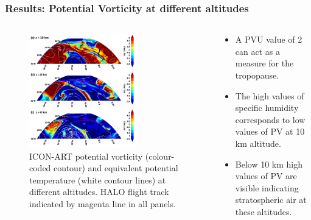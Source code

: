 \documentclass[18pt]{beamer}
\begin{document}
	\begin{frame}
	\frametitle{Results: Potential Vorticity at different altitudes}
	
	\begin{columns}
		\begin{block}{}
			\begin{figure}
				\centering
				\includegraphics[width=0.7\textwidth]{polarpic2.png}
				\caption{\scriptsize {ICON-ART potential vorticity (colour-coded contour) and equivalent potential temperature (white contour lines) at different altitudes. HALO flight track indicated by magenta line in all panels. }
				}
			\end{figure}
		\end{block}
		\column{.5\textwidth}
		\begin{block}{}
			\begin{itemize}
				\item A PVU value of 2 can act as a measure for the tropopause.
				\item The high values of specific humidity corresponds to low values of PV at 10 km altitude. 
				\item Below 10 km high values of PV are visible indicating stratospheric air at these altitudes.
			\end{itemize}
		\end{block}
	\end{columns}
\end{frame}
\end{document}
